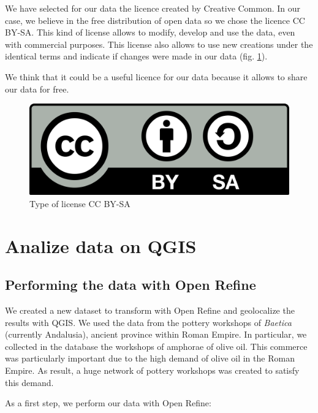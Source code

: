 \documentclass[10pt,a4paper]{article}
\begin{document}
We have selected for our data the licence created by Creative Common. In our case, we believe in the free distribution of open data so we chose the licence CC BY-SA. This kind of license allows to modify, develop and use the data, even with commercial purposes. This license also allows to use new creations under the identical terms and indicate if changes were made in our data (fig. \ref{licence}).

We think that it could be a useful licence for our data because it allows to share our data for free. 
\\
\begin{figure}[htp]
\centering
\includegraphics[scale=0.15]{licence.png}
\caption{Type of license CC BY-SA}
\label{licence}
\end{figure}


\section{Analize data on QGIS}

\subsection{Performing the data with Open Refine}

We created a new dataset to transform with Open Refine and geolocalize the results with QGIS. We used the data from the pottery workshops of \emph{Baetica} (currently Andalusia), ancient province within Roman Empire. In particular, we collected in the database the workshops of amphorae of olive oil. This commerce was particularly important due to the high demand of olive oil in the Roman Empire. As result, a huge network of pottery workshops was created to satisfy this demand. 

\newpage
As a first step, we perform our data with Open Refine:
\end{document}
